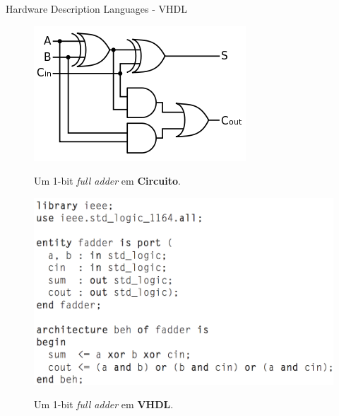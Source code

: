\documentclass[aspectratio=169]{beamer}
\begin{document}
	\begin{frame}{Hardware Description Languages - VHDL}
		\begin{figure}[h]
			\centering
			\caption{Um 1-bit \textit{full adder} em \textbf{Circuito}.}
			\includegraphics[height=0.8\textheight]{img/print/adder.png}
			\label{fig:ci}
		\end{figure}
	\end{frame}
	
	\begin{frame}%
		\begin{figure}[h]
			\centering
			\caption{Um 1-bit \textit{full adder} em \textbf{VHDL}.}
			\includegraphics[height=0.92\textheight]{img/print/vhdl.png}
			\label{fig:vhdl}
		\end{figure}
	\end{frame}
	
\end{document}
